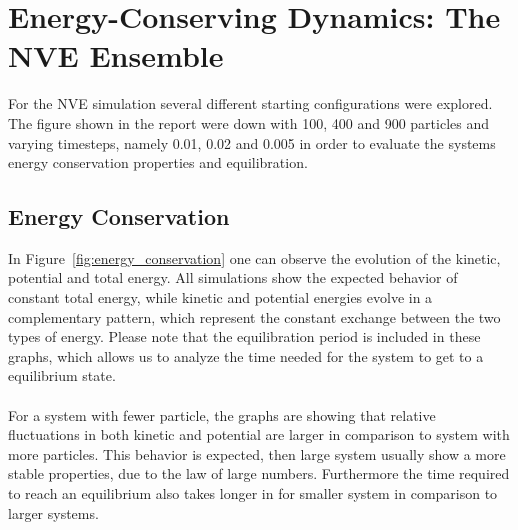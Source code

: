 \section{Energy-Conserving Dynamics: The NVE Ensemble}\label{sec:energy_conserving_dynamics_the_nve_ensemble} %
For the NVE simulation several different starting configurations were explored. The figure shown in the report were down with 100, 400 and 900 particles and varying timesteps, namely 0.01, 0.02 and 0.005 in order to evaluate the systems energy conservation properties and equilibration.
\subsection{Energy Conservation}
In Figure~\ref{fig:energy_conservation} one can observe the evolution of the kinetic, potential and total energy. All simulations show the expected behavior of constant total energy, while kinetic and potential energies evolve in a complementary pattern, which represent the constant exchange between the two types of energy. Please note that the equilibration period is included in these graphs, which allows us to analyze the time needed for the system to get to a equilibrium state.\\
\\
For a system with fewer particle, the graphs are showing that relative fluctuations in both kinetic and potential are larger in comparison to system with more particles. This behavior is expected, then large system usually show a more stable properties, due to the law of large numbers. Furthermore the time required to reach an equilibrium also takes longer in for smaller system in comparison to larger systems. 

